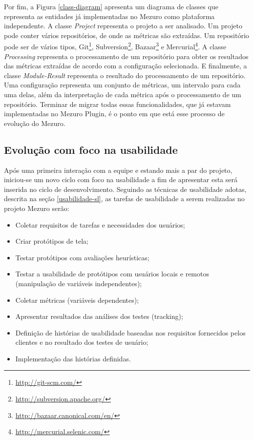 Por fim, a Figura \ref{class-diagram} apresenta um diagrama de classes que representa as entidades já implementadas no Mezuro como plataforma independente. A classe \textit{Project} representa o projeto a ser analisado. Um projeto pode conter vários repositórios, de onde as métricas são extraídas.  Um repositório pode ser de vários tipos, Git\footnote{\url{http://git-scm.com/}}, Subversion\footnote{\url{http://subversion.apache.org/}}, Bazaar\footnote{\url{http://bazaar.canonical.com/en/}} e Mercurial\footnote{\url{http://mercurial.selenic.com/}}. A classe \textit{Processing} representa o processamento de um repositório para obter os resultados das métricas extraídas de acordo com a configuração selecionada. E finalmente, a classe \textit{Module-Result} representa o resultado do processamento de um repositório. Uma configuração representa um conjunto de métricas, um intervalo para cada uma delas, além da interpretação de cada métrica após o processamento de um repositório. Terminar de  migrar todas essas funcionalidades, que já estavam implementadas no Mezuro Plugin, é o ponto em que está esse processo de evolução do Mezuro.

%
\subsection{Evolução com foco na usabilidade}
\label{evolucao-usabilidade}

Após uma primeira interação com a equipe e estando mais a par do projeto, iniciou-se um novo ciclo com foco na usabilidade a fim de apresentar esta será inserida no ciclo de desenvolvimento. Seguindo as técnicas de usabilidade adotas, descrita na seção \ref{usabilidade-sl}, as tarefas de usabilidade a serem realizadas no projeto Mezuro serão:
\begin{itemize}
\item Coletar requisitos de tarefas e necessidades dos usuários;
\item Criar protótipos de tela;
\item Testar protótipos com avaliações heurísticas;
\item Testar a usabilidade de protótipos com usuários locais e remotos (manipulação de variáveis independentes);
\item Coletar métricas (variáveis dependentes);
\item Apresentar resultados das análises dos testes (tracking);
\item Definição de histórias de usabilidade baseadas nos requisitos fornecidos pelos clientes e no resultado dos testes de usuário;
\item Implementação das histórias definidas.
\end{itemize}


